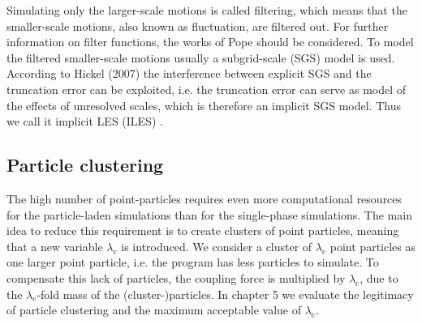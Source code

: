\documentclass[11pt,a4paper,openany,oneside,parskip=half*]{article}
\begin{document}
Simulating only the larger-scale motions is called filtering, which means that the smaller-scale motions, also known as fluctuation, are filtered out. For further information on filter functions, the works of Pope \cite{turbulentFlows} should be considered. To model the filtered smaller-scale motions usually a subgrid-scale (SGS) model is used. According to Hickel (2007) the interference between explicit SGS and the truncation error can be exploited, i.e. the truncation error can serve as model of the effects of unresolved scales, which is therefore an implicit SGS model. Thus we call it implicit LES (ILES) \cite{implicitLES}. %
\subsection{Particle clustering}
The high number of point-particles requires even more computational resources for the particle-laden simulations than for the single-phase simulations. The main idea to reduce this requirement is to create clusters of point particles, meaning that a new variable $\lambda_\mathrm{c}$ is introduced. We consider a cluster of $\lambda_\mathrm{c}$ point particles as one larger point particle, i.e. the program has less particles to simulate. To compensate this lack of particles, the coupling force is multiplied by $\lambda_\mathrm{c}$, due to the $\lambda_\mathrm{c}$-fold mass of the (cluster-)particles. In chapter 5 we evaluate the legitimacy of particle clustering and the maximum acceptable value of $\lambda_\mathrm{c}$.
\pagebreak
\end{document}
